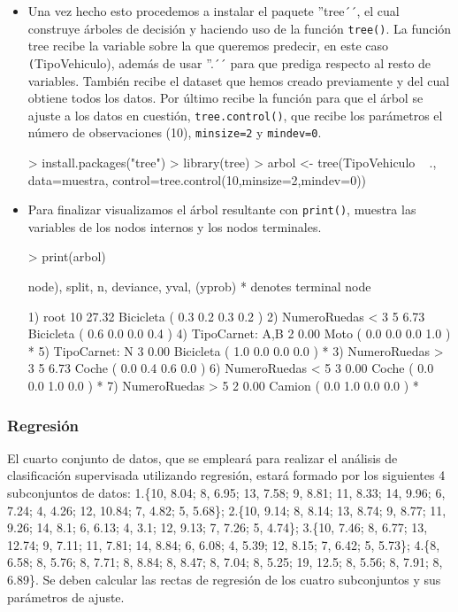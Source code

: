 \documentclass[a4paper, 12pt]{article}
\begin{document}
\begin{itemize}
    \item Una vez hecho esto procedemos a instalar el paquete ''tree´´, el cual construye árboles de decisión y haciendo uso de la función \texttt{tree()}. La función tree recibe la variable sobre la que queremos predecir, en este caso \texttt(TipoVehiculo), además de usar ''.´´ para que prediga respecto al resto de variables. También recibe el dataset que hemos creado previamente y del cual obtiene todos los datos. Por último recibe la función para que el árbol se ajuste a los datos en cuestión, \texttt{tree.control()}, que recibe los parámetros el número de observaciones (10), \texttt{minsize=2} y \texttt{mindev=0}.
\begin{Schunk}
\begin{Sinput}
> install.packages("tree")
> library(tree)
> arbol <- tree(TipoVehiculo ~ ., data=muestra, control=tree.control(10,minsize=2,mindev=0))
\end{Sinput}
\end{Schunk}
		\item Para finalizar visualizamos el árbol resultante con \texttt{print()}, muestra las variables de los nodos internos y  los nodos terminales.
\begin{Schunk}
\begin{Sinput}
> print(arbol)
\end{Sinput}
\begin{Soutput}
node), split, n, deviance, yval, (yprob)
      * denotes terminal node

1) root 10 27.32 Bicicleta ( 0.3 0.2 0.3 0.2 )  
  2) NumeroRuedas < 3 5  6.73 Bicicleta ( 0.6 0.0 0.0 0.4 )  
    4) TipoCarnet: A,B 2  0.00 Moto ( 0.0 0.0 0.0 1.0 ) *
    5) TipoCarnet: N 3  0.00 Bicicleta ( 1.0 0.0 0.0 0.0 ) *
  3) NumeroRuedas > 3 5  6.73 Coche ( 0.0 0.4 0.6 0.0 )  
    6) NumeroRuedas < 5 3  0.00 Coche ( 0.0 0.0 1.0 0.0 ) *
    7) NumeroRuedas > 5 2  0.00 Camion ( 0.0 1.0 0.0 0.0 ) *
\end{Soutput}
\end{Schunk}
		\end{itemize}
	
	\subsubsection{Regresión}
	
	El cuarto conjunto de datos, que se empleará para realizar el análisis de clasificación supervisada utilizando regresión, estará formado por los siguientes 4 subconjuntos de datos: 1.\{10, 8.04; 8, 6.95; 13, 7.58; 9, 8.81; 11, 8.33; 14, 9.96; 6, 7.24; 4, 4.26; 12, 10.84; 7, 4.82; 5, 5.68\}; 2.\{10, 9.14; 8, 8.14; 13, 8.74; 9, 8.77; 11, 9.26; 14, 8.1; 6, 6.13; 4, 3.1; 12, 9.13; 7, 7.26; 5, 4.74\}; 3.\{10, 7.46; 8, 6.77; 13, 12.74; 9, 7.11; 11, 7.81; 14, 8.84; 6, 6.08; 4, 5.39; 12, 8.15; 7, 6.42; 5, 5.73\}; 4.\{8, 6.58; 8, 5.76; 8, 7.71; 8, 8.84; 8, 8.47; 8, 7.04; 8, 5.25; 19, 12.5; 8, 5.56; 8, 7.91; 8, 6.89\}. Se deben calcular las rectas de regresión de los cuatro subconjuntos y sus parámetros de ajuste.
		
\end{document}
